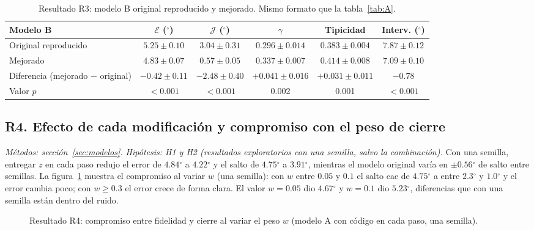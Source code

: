 \documentclass[11pt,a4paper]{article}
\newcommand{\gr}{$^{\circ}$}
\begin{document}
\begin{table}[h]
\centering\small
\setlength{\tabcolsep}{3pt}
\begin{tabular}{lccccc}
\toprule
Modelo B & $\mathcal E$ (\gr) & $\mathcal J$ (\gr) & $\gamma$ & Tipicidad & Interv. (\gr) \\
\midrule
Original reproducido & $5.25\pm0.10$ & $3.04\pm0.31$ & $0.296\pm0.014$ & $0.383\pm0.004$ & $7.87\pm0.12$ \\
Mejorado & $4.83\pm0.07$ & $0.57\pm0.05$ & $0.337\pm0.007$ & $0.414\pm0.008$ & $7.09\pm0.10$ \\
Diferencia (mejorado $-$ original) & $-0.42\pm0.11$ & $-2.48\pm0.40$ & $+0.041\pm0.016$ & $+0.031\pm0.011$ & $-0.78$ \\
Valor $p$ & $<0.001$ & $<0.001$ & 0.002 & 0.001 & $<0.001$ \\
\bottomrule
\end{tabular}
\caption{Resultado R3: modelo B original reproducido y mejorado. Mismo formato que la tabla~\ref{tab:A}.}
\label{tab:B}
\end{table}

\subsection{R4. Efecto de cada modificación y compromiso con el peso de cierre}
\label{sec:r4}

\textit{Métodos: sección~\ref{sec:modelos}. Hipótesis: H1 y H2 (resultados exploratorios con una semilla, salvo la combinación).} Con una semilla, entregar $z$ en cada paso redujo el error de $4.84$\gr{} a $4.22$\gr{} y el salto de $4.75$\gr{} a $3.91$\gr{}, mientras el modelo original varía en $\pm0.56$\gr{} de salto entre semillas. La figura~\ref{fig:w} muestra el compromiso al variar $w$ (una semilla): con $w$ entre $0.05$ y $0.1$ el salto cae de $4.75$\gr{} a entre $2.3$\gr{} y $1.0$\gr{} y el error cambia poco; con $w\ge0.3$ el error crece de forma clara. El valor $w=0.05$ dio $4.67$\gr{} y $w=0.1$ dio $5.23$\gr, diferencias que con una semilla están dentro del ruido.

\begin{figure}[h]
\centering
{}
\caption{Resultado R4: compromiso entre fidelidad y cierre al variar el peso $w$ (modelo A con código en cada paso, una semilla).}
\label{fig:w}
\end{figure}
\end{document}
